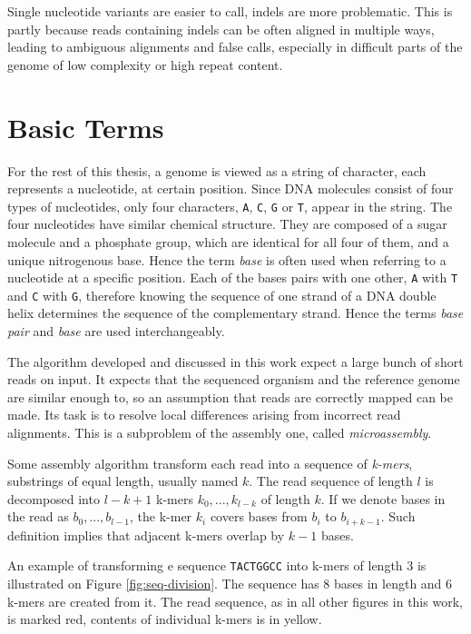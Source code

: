 Single nucleotide variants are easier to call, indels are more problematic. This is partly because reads containing indels can be often aligned in multiple ways, 
leading to ambiguous alignments and false calls, especially in difficult parts of 
the genome of low complexity or high repeat content.  

\section{Basic Terms} 
\label{sec:basic-terms} 

For the rest of this thesis, a genome is viewed as a string of character, each represents a nucleotide, at certain position. Since DNA molecules consist of four types of nucleotides, only four characters, \texttt{A}, \texttt{C}, \texttt{G} or \texttt{T}, appear in the string. The four nucleotides have similar chemical structure. They are composed of a sugar molecule and a phosphate group, which are identical for all four of them, and a unique nitrogenous base. Hence the term \textit{base} is often used when referring to a nucleotide at a specific position. Each of the bases pairs with one other, \texttt{A} with \texttt{T} and \texttt{C} with \texttt{G}, therefore knowing the sequence of one strand of a DNA double helix determines the sequence of the complementary strand. Hence the terms \textit{base pair} and \textit{base} are used interchangeably. 

The algorithm developed and discussed in this work expect a large bunch of short reads on input. It expects that the sequenced organism and the reference genome are similar enough to, so an assumption that reads are correctly mapped can be made. Its task is to resolve local differences arising from incorrect read alignments. This is a subproblem of the assembly one, called \textit{microassembly}. 

Some assembly algorithm transform each read into a sequence of \textit{k-mers}, substrings of equal length, usually named $k$. The read sequence of length $l$ is decomposed into $l - k + 1$ k-mers $k_0, ..., k_{l-k}$ of length $k$. If we denote bases in the read as $b_0, ..., b_{l-1}$, the k-mer $k_i$ covers bases from $b_i$ to $b_{i+k-1}$. Such definition implies that adjacent k-mers overlap by $k-1$ bases.  

An example of transforming e sequence \texttt{TACTGGCC} into k-mers of length $3$ is illustrated on Figure \ref{fig:seq-division}. The sequence has $8$ bases in length and $6$ k-mers are created from it. The read sequence, as in all other figures in this work, is marked red, contents of individual k-mers is in yellow. 

